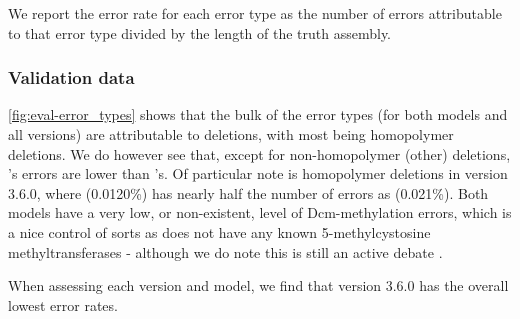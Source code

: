 We report the error rate for each error type as the number of errors attributable to that error type divided by the length of the truth assembly.

\subsubsection{Validation data}

\autoref{fig:eval-error_types} shows that the bulk of the error types (for both models and all versions) are attributable to deletions, with most being homopolymer deletions. We do however see that, except for non-homopolymer (other) deletions, \tubby{}'s errors are lower than \guppy{}'s. Of particular note is homopolymer deletions in version 3.6.0, where \tubby{} (0.0120\%) has nearly half the number of errors as \guppy{} (0.021\%). Both models have a very low, or non-existent, level of Dcm-methylation errors, which is a nice control of sorts as \mtb{} does not have any known 5-methylcystosine methyltransferases - although we do note this is still an active debate \cite{Danjuma2017}.

When assessing each version and model, we find that \tubby{} version 3.6.0 has the overall lowest error rates.

